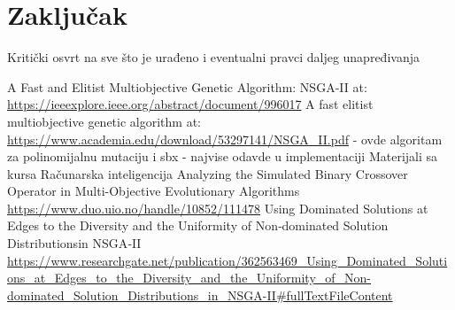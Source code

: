 \documentclass[12pt]{article}
\begin{document}

\section{Zaključak}
Kritički osvrt na sve što je urađeno i eventualni pravci daljeg unapređivanja

\renewcommand{\refname}{Literatura}
\begin{thebibliography}{10}

 A Fast and Elitist Multiobjective Genetic Algorithm:
NSGA-II at:\\ \url{https://ieeexplore.ieee.org/abstract/document/996017} 
 A fast elitist multiobjective genetic algorithm at:\\ \url{https://www.academia.edu/download/53297141/NSGA_II.pdf} - ovde algoritam za polinomijalnu mutaciju i sbx - najvise odavde u implementaciji
 Materijali sa kursa Računarska inteligencija
 Analyzing the Simulated Binary Crossover Operator in Multi-Objective Evolutionary Algorithms\\ \url{https://www.duo.uio.no/handle/10852/111478} 
 Using Dominated Solutions at Edges to the Diversity and the Uniformity of Non‑dominated Solution Distributionsin NSGA‑II \url{https://www.researchgate.net/publication/362563469_Using_Dominated_Solutions_at_Edges_to_the_Diversity_and_the_Uniformity_of_Non-dominated_Solution_Distributions_in_NSGA-II#fullTextFileContent}


\end{thebibliography}
\end{document}

